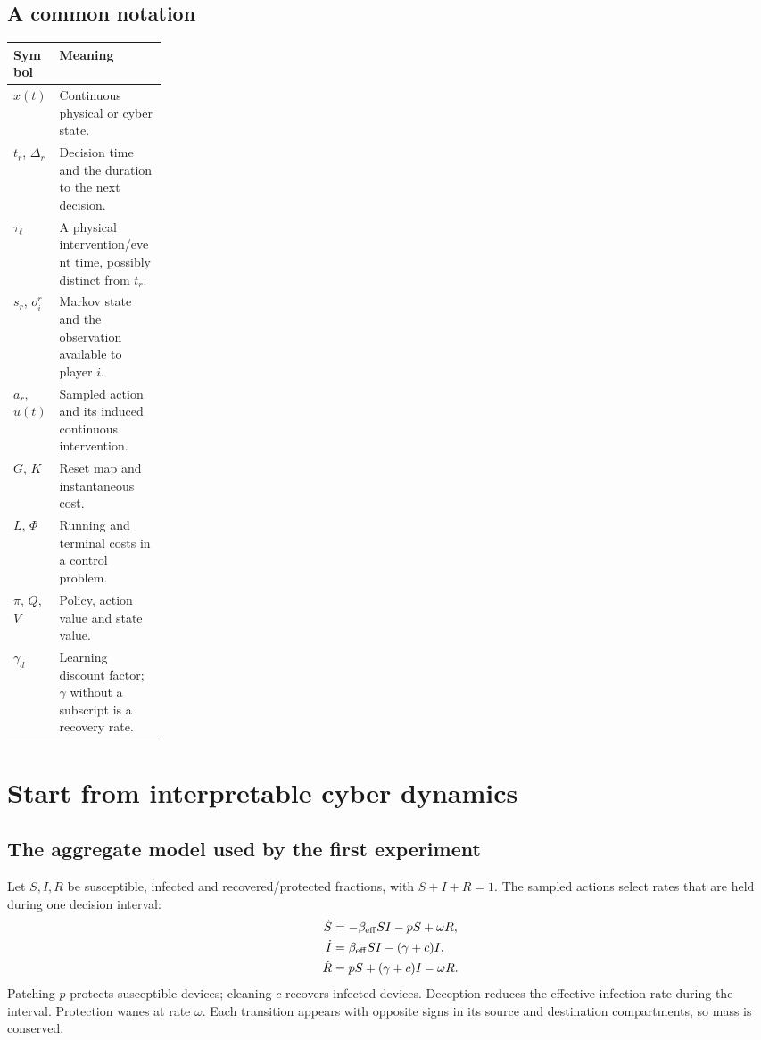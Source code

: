 \documentclass[11pt,a4paper]{article}
\theoremstyle{definition}
\theoremstyle{remark}
\begin{document}
\subsection{A common notation}
\par\noindent\begin{tabularx}{\linewidth}{@{}p{0.20\linewidth}Y@{}}
\toprule
Symbol & Meaning \\
\midrule
$x(t)$ & Continuous physical or cyber state. \\
$t_r$, $\Delta_r$ & Decision time and the duration to the next decision. \\
$\tau_\ell$ & A physical intervention/event time, possibly distinct from $t_r$. \\
$s_r$, $o_i^r$ & Markov state and the observation available to player $i$. \\
$a_r$, $u(t)$ & Sampled action and its induced continuous intervention. \\
$G$, $K$ & Reset map and instantaneous cost. \\
$L$, $\Phi$ & Running and terminal costs in a control problem. \\
$\pi$, $Q$, $V$ & Policy, action value and state value. \\
$\gamma_d$ & Learning discount factor; $\gamma$ without a subscript is a recovery rate. \\
\bottomrule
\end{tabularx}\par

\section{Start from interpretable cyber dynamics}
\subsection{The aggregate model used by the first experiment}
Let $S,I,R$ be susceptible, infected and recovered/protected fractions, with $S+I+R=1$. The sampled actions select rates that are held during one decision interval:
\begin{align}
\dot S&=-\beta_{\rm eff}SI-pS+\omega R,\nonumber\\
\dot I&=\beta_{\rm eff}SI-(\gamma+c)I,\label{eq:sampled-sir}\\
\dot R&=pS+(\gamma+c)I-\omega R.\nonumber
\end{align}
Patching $p$ protects susceptible devices; cleaning $c$ recovers infected devices. Deception reduces the effective infection rate during the interval. Protection wanes at rate $\omega$. Each transition appears with opposite signs in its source and destination compartments, so mass is conserved.
\end{document}
